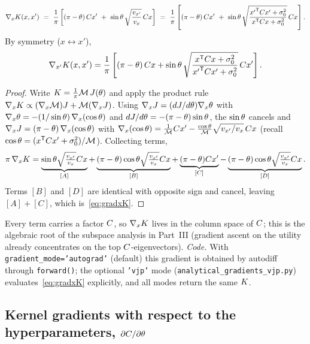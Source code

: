 \begin{proposition}
\begin{equation}
\nabla_xK(x,x')
\ =\ \frac{1}{\pi}\left[(\pi-\theta)\,C x'
\ +\ \sin\theta\,\sqrt{\frac{v_{x'}}{v_x}}\,C x\right]
\ =\ \frac{1}{\pi}\left[(\pi-\theta)\,C x'
\ +\ \sin\theta\,\sqrt{\frac{{x'}^{\mathsf{T}}C x'+\sigma_{0}^2}{x^{\mathsf{T}}C x+\sigma_{0}^2}}\,C x\right].
\label{eq:gradxK}
\end{equation}
By symmetry ($x\leftrightarrow x'$),
\begin{equation}
\nabla_{x'}K(x,x')
=\frac{1}{\pi}\left[(\pi-\theta)\,C x
+\sin\theta\,\sqrt{\frac{x^{\mathsf{T}}C x+\sigma_{0}^2}{{x'}^{\mathsf{T}}C x'+\sigma_{0}^2}}\,C x'\right].
\end{equation}
\end{proposition}

\begin{proof}
Write $K=\tfrac1\pi\mathcal{M}\,J(\theta)$ and apply the product rule
$\nabla_xK\propto(\nabla_x\mathcal{M})J+\mathcal{M}(\nabla_xJ)$. Using
$\nabla_xJ=(dJ/d\theta)\nabla_x\theta$ with
$\nabla_x\theta=-(1/\sin\theta)\,\nabla_x(\cos\theta)$ and
$dJ/d\theta=-(\pi-\theta)\sin\theta$, the $\sin\theta$ cancels and
$\nabla_xJ=(\pi-\theta)\,\nabla_x(\cos\theta)$ with
$\nabla_x(\cos\theta)=\tfrac1{\mathcal{M}}C x'-\tfrac{\cos\theta}{\mathcal{M}}\sqrt{v_{x'}/v_x}\,C x$
(recall $\cos\theta=(x^{\mathsf{T}}C x'+\sigma_{0}^2)/\mathcal{M}$). Collecting terms,
\[
\pi\,\nabla_xK
=\underbrace{\sin\theta\sqrt{\tfrac{v_{x'}}{v_x}}C x}_{[A]}
+\underbrace{(\pi-\theta)\cos\theta\sqrt{\tfrac{v_{x'}}{v_x}}C x}_{[B]}
+\underbrace{(\pi-\theta)C x'}_{[C]}
-\underbrace{(\pi-\theta)\cos\theta\sqrt{\tfrac{v_{x'}}{v_x}}C x}_{[D]} .
\]
Terms $[B]$ and $[D]$ are identical with opposite sign and cancel, leaving
$[A]+[C]$, which is~\eqref{eq:gradxK}.
\end{proof}

Every term carries a factor $C$, so $\nabla_xK$ lives in the column space of
$C$; this is the algebraic root of the subspace analysis in Part~III (gradient
ascent on the utility already concentrates on the top $C$-eigenvectors).
\emph{Code.} With \texttt{gradient\_mode='autograd'} (default) this gradient is
obtained by autodiff through \texttt{forward()}; the optional \texttt{'vjp'} mode
(\texttt{analytical\_gradients\_vjp.py}) evaluates~\eqref{eq:gradxK} explicitly, and
all modes return the same $K$.

\subsection{Kernel gradients with respect to the hyperparameters, $\partial C/\partial\theta$}
\label{subsec:dCtheta}

